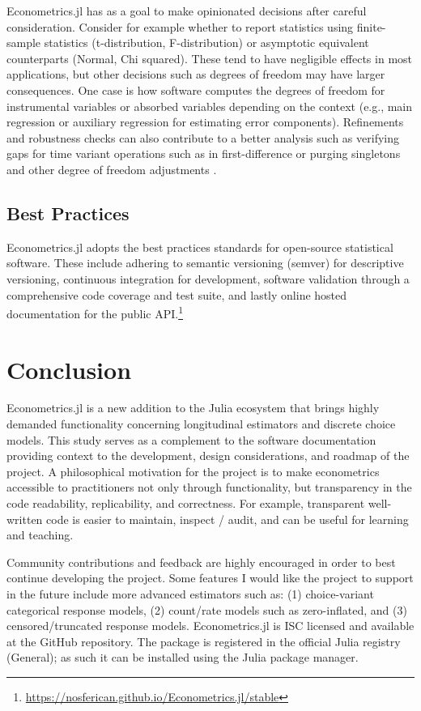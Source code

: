 \documentclass{juliacon}
\begin{document}
Econometrics.jl has as a goal to make opinionated decisions after careful consideration. Consider for example whether to report statistics using finite-sample statistics (t-distribution, F-distribution) or asymptotic equivalent counterparts (Normal, Chi squared). These tend to have negligible effects in most applications, but other decisions such as degrees of freedom may have larger consequences. One case is how software computes the degrees of freedom for instrumental variables or absorbed variables depending on the context (e.g., main regression or auxiliary regression for estimating error components). Refinements and robustness checks can also contribute to a better analysis such as verifying gaps for time variant operations such as in first-difference or purging singletons and other degree of freedom adjustments \cite{Singletons}.

\subsection{Best Practices}

Econometrics.jl adopts the best practices standards for open-source statistical software. These include adhering to semantic versioning (semver) for descriptive versioning, continuous integration for development, software validation through a comprehensive code coverage and test suite, and lastly online hosted documentation for the public API.\footnote{\href{https://nosferican.github.io/Econometrics.jl/stable}{https://nosferican.github.io/Econometrics.jl/stable}}

\section{Conclusion}

Econometrics.jl is a new addition to the Julia ecosystem that brings highly demanded functionality concerning longitudinal estimators and discrete choice models. This study serves as a complement to the software documentation providing context to the development, design considerations, and roadmap of the project. A philosophical motivation for the project is to make econometrics accessible to practitioners not only through functionality, but transparency in the code readability, replicability, and correctness. For example, transparent well-written code is easier to maintain, inspect / audit, and can be useful for learning and teaching.

Community contributions and feedback are highly encouraged in order to best continue developing the project. Some features I would like the project to support in the future include more advanced estimators such as: (1) choice-variant categorical response models, (2) count/rate models such as zero-inflated, and (3) censored/truncated response models. Econometrics.jl is ISC licensed and available at the GitHub repository. The package is registered in the official Julia registry (General); as such it can be installed using the Julia package manager.
\end{document}
